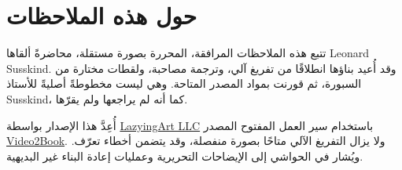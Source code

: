 \documentclass[11pt,oneside]{book}
\begin{document}
\frontmatter
\hypersetup{pageanchor=false}

\hypersetup{pageanchor=true}

\clearpage
\chapter*{حول هذه الملاحظات}
تتبع هذه الملاحظات المرافقة، المحررة بصورة مستقلة، محاضرةً ألقاها Leonard Susskind. وقد أُعيد بناؤها انطلاقًا من تفريغ آلي، وترجمة مصاحبة، ولقطات مختارة من السبورة، ثم قورنت بمواد المصدر المتاحة. وهي ليست مخطوطةً أصليةً للأستاذ Susskind، كما أنه لم يراجعها ولم يقرّها.

أُعِدَّ هذا الإصدار بواسطة \href{https://lazying.art}{LazyingArt LLC}
باستخدام سير العمل المفتوح المصدر
\href{https://github.com/lachlanchen/Video2Book}{Video2Book}.
ولا يزال التفريغ الآلي متاحًا بصورة منفصلة، وقد يتضمن أخطاء تعرّف. ويُشار في الحواشي إلى الإيضاحات التحريرية وعمليات إعادة البناء غير البديهية.
\clearpage
\tableofcontents
\mainmatter
\graphicspath{{../../../generated_course_notes/supplementary/higgs_boson/2012_summer/chapters/lecture_01/}{../../../generated_course_notes/supplementary/higgs_boson/2012_summer/figures/}{../../../generated_course_notes/supplementary/higgs_boson/2012_summer/assets/}}

\end{document}
